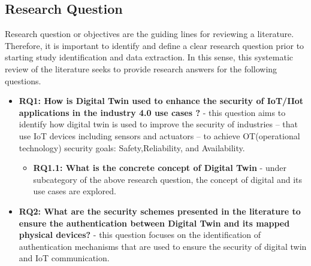 
\subsection{Research Question}
Research question or objectives are the guiding lines for reviewing a literature. Therefore, it is important to identify and define a clear research question prior to starting study identification and data extraction\cite{carrera-rivera_how-conduct_2022}. In this sense, this systematic review of the literature seeks to provide research answers for the following questions.
\begin{itemize}

    \item \textbf{RQ1: How is Digital Twin used to enhance the security of IoT/IIot applications in the industry 4.0 use cases ?} - 
    this question aims to identify how digital twin is used to improve the security of industries -- that use IoT devices including sensors and actuators -- to achieve OT(operational technology) security goals: Safety,Reliability, and Availability.
    \begin{itemize}
        \item \textbf{RQ1.1: What is the concrete concept of Digital Twin} - 
        under subcategory of the above research question, the concept of digital and its use cases are explored.
    \end{itemize}

    \item \textbf{RQ2: What are the security schemes presented in the literature to ensure the authentication between Digital Twin and its mapped physical devices?} - 
    this question focuses on the identification of authentication mechanisms that are used to ensure the security of digital twin and IoT communication.
\end{itemize}